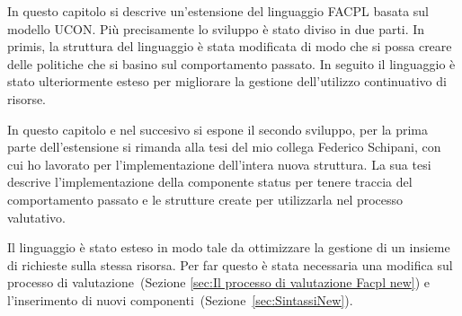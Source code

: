 \label{chap:Usage Control in FACPL}
In questo capitolo si descrive un'estensione del linguaggio \ac{FACPL} basata sul modello \ac{UCON}.
Più precisamente lo sviluppo è stato diviso in due parti. In primis, la struttura del linguaggio è stata modificata di modo
che si possa creare delle politiche che si basino sul comportamento passato. In seguito il linguaggio
è stato ulteriormente esteso per migliorare la gestione dell'utilizzo continuativo di risorse.\par
In questo capitolo e nel succesivo si espone il secondo sviluppo, per la prima parte dell'estensione si rimanda
alla tesi del mio collega Federico Schipani, con cui ho lavorato per l'implementazione dell'intera nuova struttura.
La sua tesi descrive l'implementazione della componente status per tenere traccia del comportamento passato e
le strutture create per utilizzarla nel processo valutativo. \par
Il linguaggio è stato esteso in modo tale da ottimizzare la gestione di un insieme di richieste sulla stessa risorsa.
Per far questo è stata necessaria una modifica sul processo di valutazione~(Sezione \ref{sec:Il processo di valutazione Facpl new})
e l'inserimento di nuovi componenti~(Sezione~\ref{sec:SintassiNew}).
